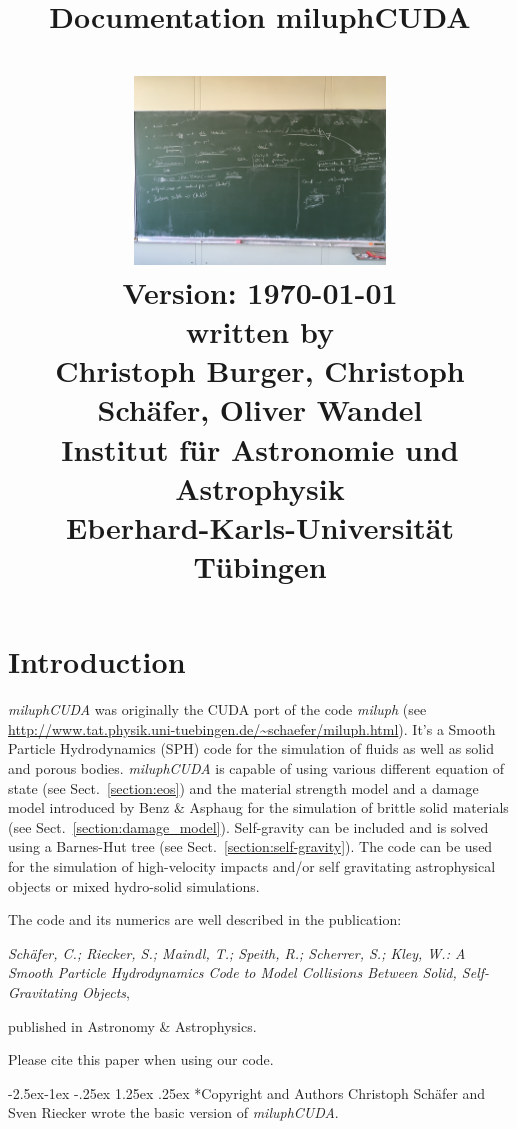 \documentclass[10pt,fleqn,twoside]{article}
\title{ {\Large \textbf{Documentation miluphCUDA}
    }\\[0.2cm] \crule[unirot]{0.5em}{0.5em}~~~\crule[blue]{0.5em}{0.5em}~~~\crule[unigold]{0.5em}{0.5em}\\[0.2cm]
\centering\includegraphics[width=0.5\textwidth]{pic/IMG_1058.jpg}\\
\vfill \normalsize
{\large Version: \today}\\[0.8cm]
written by \\
Christoph Burger, Christoph Schäfer, Oliver Wandel \\ Institut für Astronomie und
Astrophysik \\ Eberhard-Karls-Universität Tübingen}
\date{\vspace{-5ex}}
\makeatletter
\renewcommand\paragraph{\@startsection{paragraph}{4}{\z@}%
            {-2.5ex\@plus -1ex \@minus -.25ex}%
            {1.25ex \@plus .25ex}%
            {\normalfont\normalsize\bfseries}}
\makeatother
\begin{document}

\maketitle
\thispagestyle{empty}
\newpage
\tableofcontents
\newpage
\setcounter{page}{1}




\section{Introduction}
\emph{miluphCUDA} was originally the CUDA port of the code \emph{miluph} (see \url{http://www.tat.physik.uni-tuebingen.de/~schaefer/miluph.html}).
It's a Smooth Particle Hydrodynamics (SPH) code for the simulation of fluids as well as solid and porous bodies.
\emph{miluphCUDA} is capable of using various different equation of state (see Sect.~\ref{section:eos}) and the material strength model and a damage model introduced by Benz \& Asphaug for the simulation of brittle solid materials (see Sect.~\ref{section:damage_model}). Self-gravity can be included and is solved using a Barnes-Hut tree (see Sect.~\ref{section:self-gravity}). The code can be used for the simulation of high-velocity impacts and/or self gravitating astrophysical objects or mixed hydro-solid simulations.

The code and its numerics are well described in the publication:

\emph{Schäfer, C.; Riecker, S.; Maindl, T.; Speith, R.; Scherrer, S.; Kley, W.: A Smooth Particle Hydrodynamics Code to Model Collisions Between Solid, Self-Gravitating Objects},

published in Astronomy \& Astrophysics.

Please cite this paper when using our code.


\paragraph*{Copyright and Authors}
Christoph Schäfer and Sven Riecker wrote the basic version of \emph{miluphCUDA}.
\end{document}
